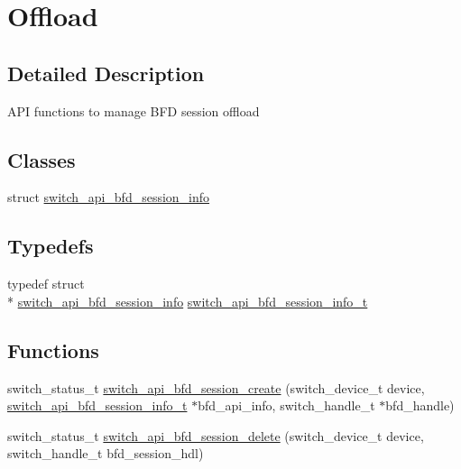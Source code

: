 \hypertarget{group__BFD}{\section{Offload}
\label{group__BFD}
}


\subsection{Detailed Description}
A\+P\+I functions to manage B\+F\+D session offload \subsection*{Classes}
\begin{DoxyCompactItemize}
\item 
struct \hyperlink{structswitch__api__bfd__session__info}{switch\+\_\+api\+\_\+bfd\+\_\+session\+\_\+info}
\end{DoxyCompactItemize}
\subsection*{Typedefs}
\begin{DoxyCompactItemize}
\item 
typedef struct \\*
\hyperlink{structswitch__api__bfd__session__info}{switch\+\_\+api\+\_\+bfd\+\_\+session\+\_\+info} \hyperlink{group__BFD_gac35c149be420a6b31ae5326113a7fa31}{switch\+\_\+api\+\_\+bfd\+\_\+session\+\_\+info\+\_\+t}
\end{DoxyCompactItemize}
\subsection*{Functions}
\begin{DoxyCompactItemize}
\item 
switch\+\_\+status\+\_\+t \hyperlink{group__BFD_gae303379f2306f4b90b114e6a2601983a}{switch\+\_\+api\+\_\+bfd\+\_\+session\+\_\+create} (switch\+\_\+device\+\_\+t device, \hyperlink{group__BFD_gac35c149be420a6b31ae5326113a7fa31}{switch\+\_\+api\+\_\+bfd\+\_\+session\+\_\+info\+\_\+t} $\ast$bfd\+\_\+api\+\_\+info, switch\+\_\+handle\+\_\+t $\ast$bfd\+\_\+handle)
\item 
switch\+\_\+status\+\_\+t \hyperlink{group__BFD_ga9afb063821d616a0941b8eee45d2b858}{switch\+\_\+api\+\_\+bfd\+\_\+session\+\_\+delete} (switch\+\_\+device\+\_\+t device, switch\+\_\+handle\+\_\+t bfd\+\_\+session\+\_\+hdl)
\end{DoxyCompactItemize}


